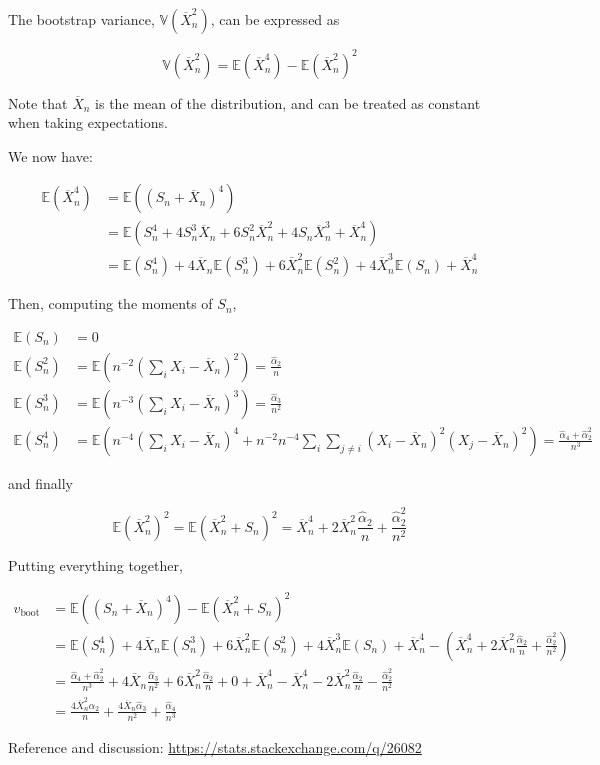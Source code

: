 The bootstrap variance, \(\mathbb{V}\left(\overline{X}_n^2\right)\), can
be expressed as

\[ \mathbb{V}\left(\overline{X}_n^2\right) = \mathbb{E}\left(\overline{X}_n^4\right) - \mathbb{E}\left(\overline{X}_n^2\right)^2 \]

Note that \(\overline{X}_n\) is the mean of the distribution, and can be
treated as constant when taking expectations.

We now have:

\begin{align}
\mathbb{E}\left(\overline{X}_n^4\right) &= \mathbb{E}\left( (S_n + \overline{X}_n)^4 \right) \\
&= \mathbb{E}\left( S_n^4 + 4 S_n^3 \overline{X}_n + 6 S_n^2 \overline{X}_n^2 + 4 S_n \overline{X}_n^3 + \overline{X}_n^4 \right) \\
&= \mathbb{E}(S_n^4) + 4 \overline{X}_n \mathbb{E}(S_n^3) + 6 \overline{X}_n^2 \mathbb{E}(S_n^2) + 4 \overline{X}_n^3 \mathbb{E}(S_n) + \overline{X}_n^4
\end{align}

Then, computing the moments of \(S_n\),

\begin{align}
\mathbb{E}(S_n) &= 0 \\
\mathbb{E}(S_n^2) &= \mathbb{E}\left( n^{-2} \left( \sum_i X_i - \overline{X}_n \right)^2 \right) = \frac{\hat{\alpha}_2}{n} \\
\mathbb{E}(S_n^3) &= \mathbb{E}\left( n^{-3} \left( \sum_i X_i - \overline{X}_n \right)^3 \right) = \frac{\hat{\alpha}_3}{n^2} \\
\mathbb{E}(S_n^4) &= \mathbb{E}\left( n^{-4} \left( \sum_i X_i - \overline{X}_n \right)^4 + n^{-2}n^{-4} \sum_i \sum_{j \neq i} (X_i - \overline{X}_n)^2 (X_j - \overline{X}_n)^2 \right) = \frac{\hat{\alpha}_4 + \hat{\alpha}_2^2}{n^3}
\end{align}

and finally

\[
\mathbb{E}\left(\overline{X}_n^2\right)^2 = \mathbb{E}\left(\overline{X}_n^2 + S_n\right)^2 = \overline{X}_n^4 + 2 \overline{X}_n^2 \frac{\hat{\alpha}_2}{n} + \frac{\hat{\alpha}_2^2}{n^2}
\]

Putting everything together,

\begin{align}
v_\text{boot} &= \mathbb{E}\left( (S_n + \overline{X}_n)^4 \right) - \mathbb{E}\left(\overline{X}_n^2 + S_n\right)^2 \\
&= \mathbb{E}(S_n^4) + 4 \overline{X}_n \mathbb{E}(S_n^3) + 6 \overline{X}_n^2 \mathbb{E}(S_n^2) + 4 \overline{X}_n^3 \mathbb{E}(S_n) + \overline{X}_n^4 - \left( \overline{X}_n^4 + 2 \overline{X}_n^2 \frac{\hat{\alpha}_2}{n} + \frac{\hat{\alpha}_2^2}{n^2}\right) \\
&= \frac{\hat{\alpha}_4 + \hat{\alpha}_2^2}{n^3} + 4 \overline{X}_n \frac{\hat{\alpha}_3}{n^2} + 6 \overline{X}_n^2 \frac{\hat{\alpha}_2}{n} + 0 + \overline{X}_n^4 - \overline{X}_n^4 - 2 \overline{X}_n^2 \frac{\hat{\alpha}_2}{n} - \frac{\hat{\alpha}_2^2}{n^2} \\
&= \frac{4 \overline{X}_n^2 \hat{\alpha}_2}{n} + \frac{4 \overline{X}_n \hat{\alpha}_3}{n^2} + \frac{\hat{\alpha}_4}{n^3}
\end{align}

Reference and discussion: \url{https://stats.stackexchange.com/q/26082}

